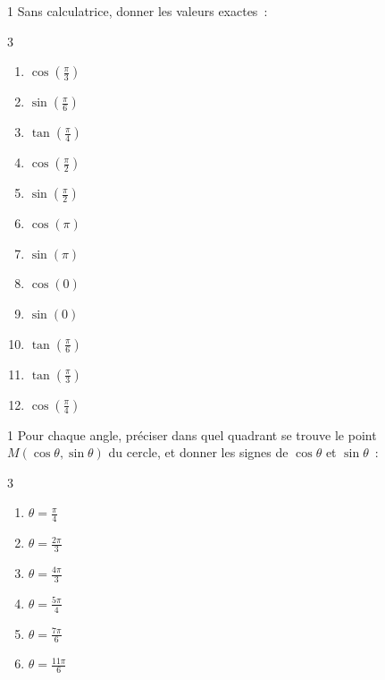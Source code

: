 \begin{exo}{1}
Sans calculatrice, donner les valeurs exactes~:
\begin{multicols}{3}
\begin{enumerate}
  \item $\cos(\frac{\pi}{3})$
  \item $\sin(\frac{\pi}{6})$
  \item $\tan(\frac{\pi}{4})$
  \item $\cos(\frac{\pi}{2})$
  \item $\sin(\frac{\pi}{2})$
  \item $\cos(\pi)$
  \item $\sin(\pi)$
  \item $\cos(0)$
  \item $\sin(0)$
  \item $\tan(\frac{\pi}{6})$
  \item $\tan(\frac{\pi}{3})$
  \item $\cos(\frac{\pi}{4})$
\end{enumerate}
\end{multicols}
\end{exo}

\begin{exo}{1}
Pour chaque angle, pr\'eciser dans quel quadrant se trouve le point
$M(\cos\theta,\sin\theta)$ du cercle, et donner les signes de $\cos\theta$
et $\sin\theta$~:
\begin{multicols}{3}
\begin{enumerate}
  \item $\theta = \frac{\pi}{4}$
  \item $\theta = \frac{2\pi}{3}$
  \item $\theta = \frac{4\pi}{3}$
  \item $\theta = \frac{5\pi}{4}$
  \item $\theta = \frac{7\pi}{6}$
  \item $\theta = \frac{11\pi}{6}$
\end{enumerate}
\end{multicols}
\end{exo}

